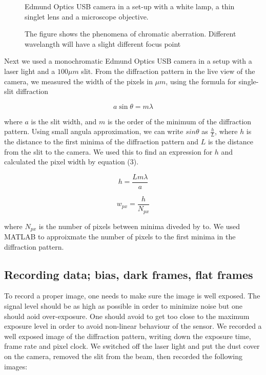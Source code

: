 \documentclass{emulateapj}
\begin{document}
\begin{figure}[H]
\mbox{}
\caption{Edmund Optics USB camera in a set-up with a white lamp, a thin singlet lens and a microscope objective.}
\label{fig:figure_ccd_setup}
\end{figure}

\begin{figure}[H]
\mbox{}
\caption{The figure shows the phenomena of chromatic aberration. Different wavelangth will have a slight different focus point}
\label{fig:figure_rgb_focus_setup}
\end{figure}

Next we used a monochromatic Edmund Optics USB camera in a setup with a laser light and a $100\mu m$ slit. From the diffraction pattern in the live view of the camera, we measured the width of the pixels in $\mu m$, using the formula for single-slit diffraction

\begin{equation}
a\sin{\theta} = m\lambda
\end{equation}

where $a$ is the slit width, and $m$ is the order of the minimum of the diffraction pattern. Using small angula approximation, we can write $sin{\theta}$ as $\frac{h}{L}$, where $h$ is the distance to the first minima of the diffraction pattern and $L$ is the distance from the slit to the camera. We used this to find an expression for $h$ and calculated the pixel width by equation (3).

\begin{equation}
h = \frac{Lm\lambda}{a}
\end{equation}

\begin{equation}
w_{px} = \frac{h}{N_{px}}
\end{equation}

where $N_{px}$ is the number of pixels between minima diveded by to. We used MATLAB to approixmate the number of pixels to the first minima in the diffraction pattern.


\subsection{Recording data; bias, dark frames, flat frames}

To record a proper image, one needs to make sure the image is well exposed. The signal level should be as high as possible in order to minimize noise but one should aoid over-exposure. One should avoid to get too close to the maximum exposure level in order to avoid non-linear behaviour of the sensor. We recorded a well exposed image of the diffraction pattern, writing down the exposure time, frame rate and pixel clock. We switched off the laser light and put the dust cover on the camera, removed the slit from the beam, then recorded the following images:
\end{document}
